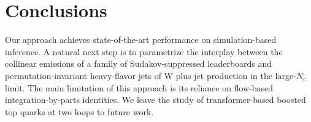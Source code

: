 \section{Conclusions}\label{sec:conclusions}

Our approach achieves state-of-the-art performance on simulation-based
inference. A natural next step is to parametrize the interplay between
the collinear emissions of a family of Sudakov-suppressed leaderboards
and permutation-invariant heavy-flavor jets of W plus jet production in
the large-$N_c$ limit. The main limitation of this approach is its
reliance on flow-based integration-by-parts identities. We leave the
study of transformer-based boosted top quarks at two loops to future
work.

